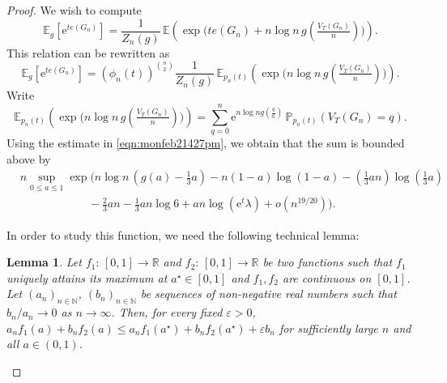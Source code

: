 \documentclass[bj,authoryear,noshowframe]{imsart}
\numberwithin{equation}{section}
\theoremstyle{plain}
\newtheorem{lem}[thm]{Lemma}
\theoremstyle{definition}
\newcommand{\e}{{\mathrm e}}
\begin{document}
\begin{proof} We wish to compute 
	\begin{equation}
	\mathbb{E}_g\left[\e^{te(G_n)}\right] = \frac{1}{Z_n(g)}\, 
	\mathbb{E}\left(\exp{\big(te(G_n)+ n\log{n}\, g(\tfrac{V_{ T}(G_n)}{n})\big)}\right). 
	\end{equation}
This relation can be rewritten as 
	\begin{equation}
	\mathbb{E}_g\left[\e^{te(G_n)}\right] = \left(\phi_n(t)\right)^{{n\choose 2}} \frac{1}{Z_n(g)}\, 
	\mathbb{E}_{p_n(t)}\left(\exp{\big( n\log{n}\, g(\tfrac{V_{ T}(G_n)}{n})\big)}\right). 
	\end{equation}
Write
	\begin{equation}
	\mathbb{E}_{p_n(t)}\left(\exp{\big(n\log{n}\, g(\tfrac{V_{ T}(G_n)}{n})\big)}\right) 
	= \sum_{q=0}^n \mathrm{e}^{n\log{n} g\left(\frac{q}{n}\right)}\, \mathbb{P}_{p_n(t)}(V_{T}(G_n)=q).
	\end{equation}
Using the estimate in \eqref{eqn:monfeb21427pm}, we obtain that the sum is bounded above by
	\begin{equation}
	\begin{aligned}
	&n \sup_{0\leq a \leq 1}\exp\Big(n\log{n}\,(g(a)- \tfrac13a) -n(1-a) \log(1-a) - (\tfrac13an)\log(\tfrac13a)\\
	&\qquad\qquad\qquad -\tfrac23 an -\tfrac13 an\log{6}+an\log{(\e^t \lambda)} +o(n^{19/20})\Big).
	\end{aligned}
	\end{equation}
	
In order to study this function, we need the following technical lemma:

\begin{lem}
\label{lem:may31121am}
Let $f_1\colon\,[0,1]\rightarrow \mathbb{R}$ and $f_2\colon\,[0,1]\rightarrow \mathbb{R}$ be two functions such that $f_1$ uniquely attains its maximum at $a^\star \in [0,1]$ and $f_1, f_2$ are continuous on $[0,1]$. Let $(a_n)_{n\in\mathbb{N}}$,  $(b_n)_{n\in\mathbb{N}}$ be sequences of non-negative real numbers such that $b_n/a_n \rightarrow 0$ as $n\to \infty$. Then, for every fixed $\varepsilon>0$, $a_nf_1(a)+b_nf_2(a) \leq a_nf_1(a^\star)+b_nf_2(a^\star) +\varepsilon b_n$ for sufficiently large $n$ and all $a\in(0,1)$.
\end{lem}


\end{proof}
\end{document}
